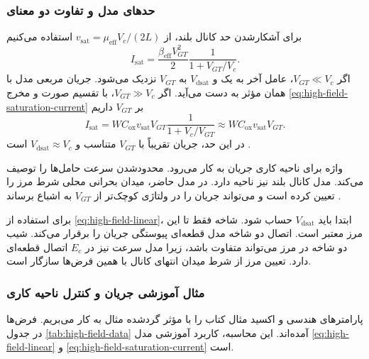 \subsubsection*{حدهای مدل و تفاوت دو معنای }
برای آشکارشدن حد کانال بلند، از \(v_{\mathrm{sat}}=
\mu_{\mathrm{eff}}V_c/(2L)\) استفاده می‌کنیم
\begin{equation}
 I_{\mathrm{sat}}=
 \frac{\beta_{\mathrm{eff}}V_{GT}^2}{2}
 \frac{1}{1+V_{GT}/V_c}.
 \label{eq:current-reduction-factor}
\end{equation}
اگر \(V_{GT}\ll V_c\)، عامل آخر به یک و
\(V_{\mathrm{dsat}}\) به \(V_{GT}\) نزدیک می‌شود. جریان مربعی مدل
 با همان  مؤثر به دست می‌آید. اگر
\(V_{GT}\gg V_c\)، با تقسیم صورت و مخرج
\eqref{eq:high-field-saturation-current} بر \(V_{GT}\) داریم
\begin{equation}
 I_{\mathrm{sat}}=
 WC_{\mathrm{ox}}v_{\mathrm{sat}}V_{GT}
 \frac{1}{1+V_c/V_{GT}}
 \approx WC_{\mathrm{ox}}v_{\mathrm{sat}}V_{GT}.
 \label{eq:velocity-saturated-limit}
\end{equation}
در این حد، جریان تقریباً با \(V_{GT}\) متناسب و
\(V_{\mathrm{dsat}}\approx V_c\) است
\cite[روابط  و ]{weste}.

واژه  برای ناحیه کاری جریان به کار می‌رود.
 محدودشدن سرعت حامل‌ها را توصیف می‌کند.
مدل کانال بلند نیز ناحیه  دارد. در مدل حاضر، میدان بحرانی
محلی شرط مرز را تعیین کرده است و می‌تواند جریان را در ولتاژی کوچک‌تر از
\(V_{GT}\) به اشباع برساند \cite[پانوشت صفحه چاپی ۷۵]{weste}.

برای استفاده از \eqref{eq:high-field-linear}، ابتدا باید
\(V_{\mathrm{dsat}}\) حساب شود. شاخه  فقط تا این مرز معتبر
است. اتصال دو شاخه مدل قطعه‌ای پیوستگی جریان را برقرار می‌کند. شیب دو
شاخه در مرز می‌تواند متفاوت باشد، زیرا مدل سرعت نیز در \(E_c\) اتصال
قطعه‌ای دارد. تعیین مرز از شرط میدان انتهای کانال با همین فرض‌ها سازگار است.

\subsubsection*{مثال آموزشی جریان و کنترل ناحیه کاری}
پارامترهای هندسی و اکسید مثال  کتاب را با  مؤثر
گرد‌شده مثال  به کار می‌بریم. فرض‌ها در جدول
\ref{tab:high-field-data} آمده‌اند. این محاسبه، کاربرد آموزشی مدل
\eqref{eq:high-field-linear} و \eqref{eq:high-field-saturation-current} است.

